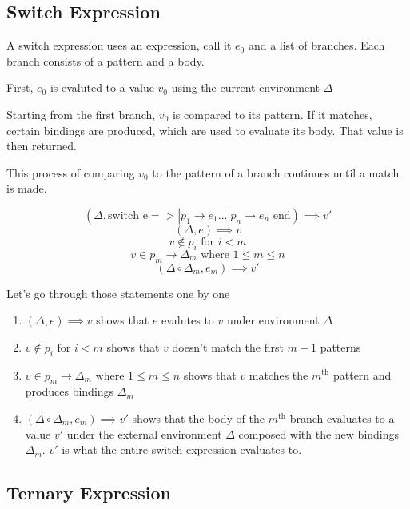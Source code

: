 \documentclass[titlepage]{article}
\begin{document}
\subsection{Switch Expression}

A switch expression uses an expression, call it $e_0$ and a list of branches. Each branch consists of a pattern and a body.

First, $e_0$ is evaluted to a value $v_0$ using the current environment $\Delta$

Starting from the first branch, $v_0$ is compared to its pattern. If it matches, certain bindings are produced, which are used to evaluate its body. That value is then returned.

This process of comparing $v_0$ to the pattern of a branch continues until a match is made.



$$(\Delta, \text{switch e} => | p_1 \rightarrow e_1 ... | p_n \rightarrow e_n \text{ end}) \implies v'$$
\noindent\makebox[\linewidth]{\rule{3in}{0.4pt}}
$$(\Delta, e) \implies v$$
$$v \notin p_i \text{ for } i < m$$
$$v \in p_m \rightarrow \Delta_m \text{ where } 1 \leq m \leq n$$
$$(\Delta \circ \Delta_m, e_m) \implies v'$$


Let's go through those statements one by one

\begin{enumerate}

\item $(\Delta, e) \implies v$ shows that $e$ evalutes to $v$ under environment $\Delta$

\item $v \notin p_i \text{ for } i < m$ shows that $v$ doesn't match the first $m - 1$ patterns

\item $v \in p_m \rightarrow \Delta_m \text{ where } 1 \leq m \leq n$ shows that $v$ matches the $m^ \text{th}$ pattern and produces bindings $\Delta_m$

\item $(\Delta \circ \Delta_m, e_m) \implies v'$ shows that the body of the $m ^ \text{th}$ branch evaluates to a value $v'$ under the external environment $\Delta$ composed with the new bindings $\Delta_m$. $v'$ is what the entire switch expression evaluates to.

\end{enumerate}



\subsection{Ternary Expression}
\end{document}
